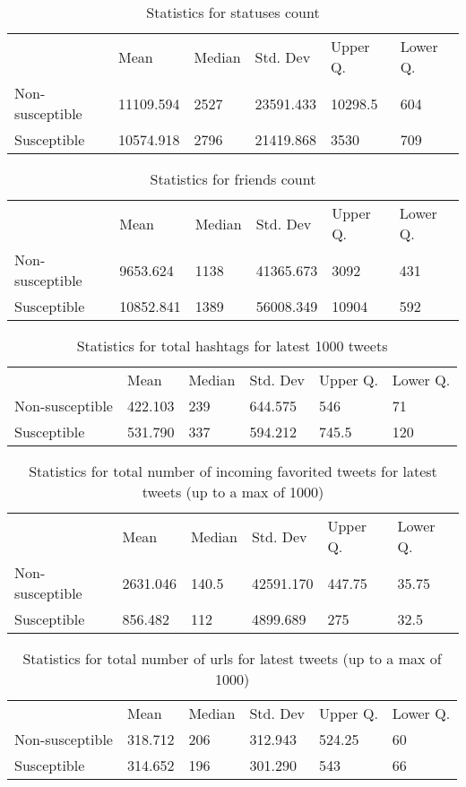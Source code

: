 \documentclass[10pt]{IEEEtran}
\begin{document}
\begin{table}[ht]
\begin{tabular}{llllll}
\textbf{}       & Mean      & Median & Std. Dev  & Upper Q. & Lower Q. \\
Non-susceptible & 11109.594 & 2527   & 23591.433 & 10298.5  & 604      \\
Susceptible     & 10574.918 & 2796   & 21419.868 & 3530     & 709     
\end{tabular}
\caption{Statistics for statuses count}
\end{table}

\begin{table}[ht]
\begin{tabular}{llllll}
\textbf{}       & Mean      & Median & Std. Dev  & Upper Q. & Lower Q. \\
Non-susceptible & 9653.624  & 1138   & 41365.673 & 3092     & 431      \\
Susceptible     & 10852.841 & 1389   & 56008.349 & 10904    & 592     
\end{tabular}
\caption{Statistics for friends count}
\end{table}

\begin{table}[ht]
\begin{tabular}{llllll}
\textbf{}       & Mean    & Median & Std. Dev & Upper Q. & Lower Q. \\
Non-susceptible & 422.103 & 239    & 644.575  & 546      & 71       \\
Susceptible     & 531.790 & 337    & 594.212  & 745.5    & 120     
\end{tabular}
\caption{Statistics for total hashtags for latest 1000 tweets}
\end{table}

\begin{table}[ht]
\begin{tabular}{llllll}
\textbf{}       & Mean     & Median & Std. Dev  & Upper Q. & Lower Q. \\
Non-susceptible & 2631.046 & 140.5  & 42591.170 & 447.75   & 35.75    \\
Susceptible     & 856.482  & 112    & 4899.689  & 275      & 32.5    
\end{tabular}
\caption{Statistics for total number of incoming favorited tweets for latest tweets (up to a max of 1000)}
\end{table}

\begin{table}[ht]
\begin{tabular}{llllll}
\textbf{}       & Mean    & Median & Std. Dev & Upper Q. & Lower Q. \\
Non-susceptible & 318.712 & 206    & 312.943  & 524.25       & 60   \\
Susceptible     & 314.652 & 196    & 301.290  & 543       & 66    
\end{tabular}
\caption{Statistics for total number of urls for latest tweets (up to a max of 1000)}
\end{table}
\end{document}
